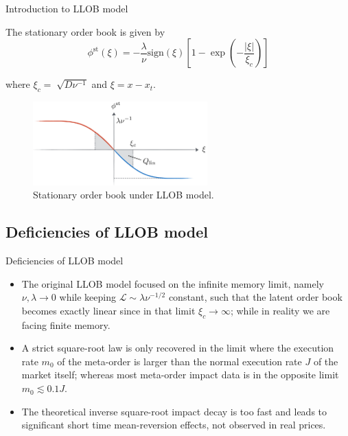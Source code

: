 \documentclass{beamer}
\begin{document}
\begin{frame}{Introduction to LLOB model}

The stationary order book is given by 
\begin{equation}
\phi^\text{st}(\xi) = -\frac{\lambda}{\nu}\text{sign}(\xi)\left[1-\exp\left(-\frac{|\xi|}{\xi_c}\right)\right]
\end{equation}

where $\xi_c =\sqrt[]{D\nu^{-1}}$ and $\xi=x-x_t$.

\begin{figure}
\centering
\includegraphics[width=0.6\textwidth]{figure1.PNG}
\caption{\label{fig:f1}Stationary order book under LLOB model.}
\end{figure}

\end{frame}

\subsection{Deficiencies of LLOB model}

\begin{frame}{Deficiencies of LLOB model}

\begin{itemize}
\item The original LLOB model focused on the infinite memory limit, namely $\nu, \lambda \to 0$ while keeping $\mathcal{L} \sim \lambda \nu^{-1/2}$ constant, such that the latent order book becomes exactly linear since in that limit $\xi_c \to \infty$; while in reality we are facing finite memory. \newline
\item A strict square-root law is only recovered in the limit where the execution rate $m_0$ of the meta-order is larger than the normal execution rate $J$ of the market itself; whereas most meta-order impact data is in the opposite limit $m_0 \lesssim 0.1J$. \newline
\item The theoretical inverse square-root impact decay is too fast and leads to significant short time mean-reversion effects, not observed in real prices.
\end{itemize}

\end{frame}
\end{document}
